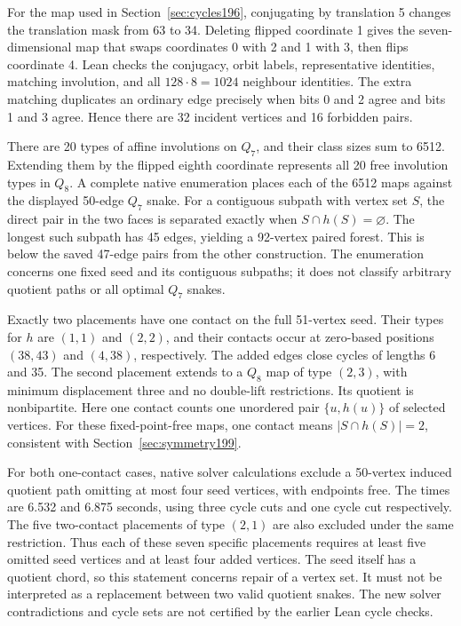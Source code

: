 \documentclass[11pt,a4paper]{article}
\theoremstyle{definition}
\theoremstyle{remark}
\begin{document}
For the map used in Section~\ref{sec:cycles196}, conjugating by
translation 5 changes the translation mask from 63 to 34. Deleting
flipped coordinate 1 gives the seven-dimensional map that swaps
coordinates 0 with 2 and 1 with 3, then flips coordinate 4.
Lean checks the conjugacy, orbit labels, representative identities,
matching involution, and all $128\cdot8=1024$ neighbour identities.
The extra matching duplicates an ordinary edge precisely when bits
0 and 2 agree and bits 1 and 3 agree. Hence there are 32 incident
vertices and 16 forbidden pairs.

There are 20 types of affine involutions on $Q_7$, and their class sizes
sum to 6512. Extending them by the flipped eighth coordinate represents
all 20 free involution types in $Q_8$. A complete native enumeration
places each of the 6512 maps against the displayed 50-edge $Q_7$ snake.
For a contiguous subpath with vertex set $S$, the direct pair in the
two faces is separated exactly when $S\cap h(S)=\varnothing$.
The longest such subpath has 45 edges, yielding a 92-vertex paired
forest. This is below the saved 47-edge pairs from the other construction.
The enumeration concerns one fixed seed and its contiguous subpaths;
it does not classify arbitrary quotient paths or all optimal $Q_7$ snakes.

Exactly two placements have one contact on the full 51-vertex seed.
Their types for $h$ are $(1,1)$ and $(2,2)$, and their contacts occur
at zero-based positions $(38,43)$ and $(4,38)$, respectively.
The added edges close cycles of lengths 6 and 35. The second placement
extends to a $Q_8$ map of type $(2,3)$, with minimum displacement three
and no double-lift restrictions. Its quotient is nonbipartite.
Here one contact counts one unordered pair $\{u,h(u)\}$ of selected
vertices. For these fixed-point-free maps, one contact means
$|S\cap h(S)|=2$, consistent with Section~\ref{sec:symmetry199}.

For both one-contact cases, native solver calculations exclude a
50-vertex induced quotient path omitting at most four seed vertices,
with endpoints free. The times are 6.532 and 6.875 seconds, using
three cycle cuts and one cycle cut respectively. The five two-contact
placements of type $(2,1)$ are also excluded under the same restriction.
Thus each of these seven specific placements requires at least five
omitted seed vertices and at least four added vertices. The seed itself
has a quotient chord, so this statement concerns repair of a vertex set.
It must not be interpreted as a replacement between two valid quotient
snakes. The new solver contradictions and cycle sets are not certified
by the earlier Lean cycle checks.
\end{document}
